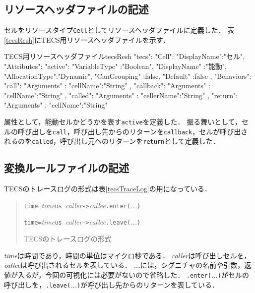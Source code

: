 \subsection{リソースヘッダファイルの記述}

セルをリソースタイプ{\tt Cell}としてリソースヘッダファイルに定義した．
表\ref{tecsResh}にTECS用リソースヘッダファイルを示す．

\begin{File}{TECS用リソースヘッダファイル}{tecsResh}
{
  "tecs":
  {
    "Cell":{
      "DisplayName":"セル",
      "Attributes":{
        "active":{
          "VariableType"  :"Boolean",
          "DisplayName"   :"能動",
          "AllocationType":"Dynamic",
          "CanGrouping"   :false,
          "Default"       :false
        }
      },
      "Behaviors":{
        "call":{
          "Arguments" :{
            "cellName":"String"
          }
        },
        "callback":{
          "Arguments" :{
            "cellName":"String"
          }
        },
        "called":{
          "Arguments"   :{
            "cellerName":"String"
          }
        },
        "return":{
          "Arguments" :{
            "cellName":"String"
          }
        }
      }
    }
  }
}
\end{File}

属性として，能動セルかどうかを表す{\tt active}を定義した．
振る舞いとして，セルの呼び出しを{\tt call}，呼び出し先からのリターンを{\tt callback}，セルが呼び出されるのを{\tt called}，呼び出し元へのリターンを{\tt return}として定義した．

\subsection{変換ルールファイルの記述}

TECSのトレースログの形式は表\ref{tecsTraceLog}の用になっている．

\begin{table}[p]
\begin{quote}
\begin{breakbox}
{\tt time=}{\it time}{\tt us }{\it caller}{\tt ->}{\it callee}{\tt .enter(}{\it ...}{\tt )}

{\tt time=}{\it time}{\tt us }{\it caller}{\tt ->}{\it callee}{\tt .leave(}{\it ...}{\tt )}
\end{breakbox}
\caption{TECSのトレースログの形式}
\label{tecsTraceLog}
\end{quote}
\end{table}

{\it time}は時間であり，時間の単位はマイクロ秒である．
{\it caller}は呼び出しセルを，{\it callee}は呼び出されるセルを表している．
{\it ...}には，シグニチャの名前や引数，返値が入るが，今回の可視化には必要がないので省略した．
{\tt .enter(}{\it ...}{\tt )}がセルの呼び出しを，{\tt .leave(}{\it ...}{\tt )}が呼び出し先からのリターンを表している．

